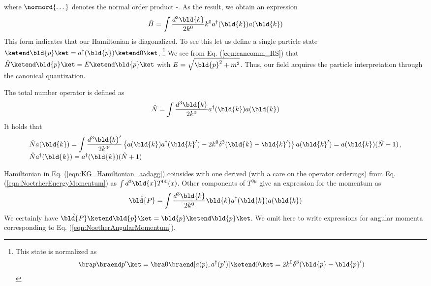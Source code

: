 where $\normord{\dots}$ denotes the normal order product \cite{ref:Peskin-Schroeder}-\cite{ref:Tong}.
As the result, we obtain an expression
\begin{equation}
\hat{H} = \int \frac{d^3 \bld{k}}{2k^0} k^0 a^\dagger(\bld{k}) a(\bld{k})
\label{eqn:KG_Hamiltonian_aadagg}
\end{equation}
This form indicates that our Hamiltonian is diagonalized.
To see this let us define a single particle state 
$\ketend \bld{p} \ket = a^\dagger(\bld{p}) \ketend 0 \ket$.
\footnote{
This state is normalized as
\[
\bra p \braend p' \ket
= \bra 0 \braend [a(p), a^\dagger(p')] \ketend 0 \ket
= 2 k^0 \delta^3 (\bld{p} - \bld{p}')
\]
}
We see from Eq. (\ref{eqn:cancomm_RS}) that
$\hat{H} \ketend \bld{p} \ket = E \ketend \bld{p} \ket$ with
$E = \sqrt{\bld{p}^2 + m^2}$.
Thus, our field acquires the particle interpretation
through the canonical quantization.

The total number operator is defined as
\begin{equation}
\hat{N} = \int \frac{d^3 \bld{k}}{2k^0} a^\dagger(\bld{k}) a(\bld{k})
\label{eqn:KG_totalNumberOp}
\end{equation}
It holds that
\begin{equation}
\begin{array}{l}
\displaystyle
\hat{N} a(\bld{k}) = 
\int \frac{d^3 \bld{k}'}{2k^{0'}} \left\{
a(\bld{k}) a^\dagger(\bld{k}') - 2 k^0 \delta^3(\bld{k} - \bld{k}') \right\} a(\bld{k}')
= a(\bld{k}) (\hat{N} - 1)\,,
\\
\hat{N} a^\dagger(\bld{k}) 
= a^\dagger(\bld{k}) (\hat{N} + 1)
\end{array}
\end{equation}

Hamiltonian in Eq. (\ref{eqn:KG_Hamiltonian_aadagg}) coinsides with
one derived (with a care on the operator orderings) from Eq. (\ref{eqn:NoetrherEnergyMomentum})
as $\int d^3\bld{x} T^{00}(x)$.
Other components of $T^{0 \mu}$ give an expression for the momentum as
\begin{eqnarray}
\hat{\bld{P}} =
\int \frac{d^3 \bld{k}}{2k^0} \bld{k} a^\dagger(\bld{k}) a(\bld{k})
\end{eqnarray}
We certainly have $\hat{\bld{P}} \ketend \bld{p} \ket = \bld{p}\ketend \bld{p} \ket$.
We omit here to write expressions for angular momenta corresponding to
Eq. (\ref{eqn:NoetherAngularMomentum}).

